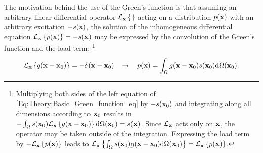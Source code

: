 The motivation behind the use of the Green's function is that assuming an arbitrary linear differential operator $\mathcal{L}_{\mathbf{x}}\left\{ \right\}$ acting on a distribution $p(\mathbf{x})$ with an arbitrary excitation $-s(\mathbf{x})$, the solution of the inhomogeneous differential equation $\mathcal{L}_{\mathbf{x}} \left\{ p(\mathbf{x}) \right\} = -s(\mathbf{x})$ may be expressed by the convolution of the Green's function and the load term:
\footnote{Multiplying both sides of the left equation of \eqref{Eq:Theory:Basic_Green_function_eq} by $-s(\mathbf{x}_0)$ and integrating along all dimensions according to $\mathbf{x}_0$ results in
$-\int_{\Omega} s(\mathbf{x}_0)\mathcal{L}_{\mathbf{x}}\left\{ g(\mathbf{x}-\mathbf{x}_0) \right\} \mathrm{d} \Omega(\mathbf{x}_0) = s(\mathbf{x})$.
Since $\mathcal{L}_{\mathbf{x}}$ acts only on $\mathbf{x}$, the operator may be taken outside of the integration.
Expressing the load term by $-\mathcal{L}_{\mathbf{x}}\left\{ p(\mathbf{x}) \right\}$ leads to $\mathcal{L}_{\mathbf{x}}\left\{ \int_{\Omega} s(\mathbf{x}_0) g(\mathbf{x}-\mathbf{x}_0) \mathrm{d} \Omega(\mathbf{x}_0) \right\} = \mathcal{L}_{\mathbf{x}}\left\{ p(\mathbf{x}) \right\}$.
}
\begin{equation}
\mathcal{L}_{\mathbf{x}}\left\{ g(\mathbf{x}-\mathbf{x}_0) \right\} = -\delta( \mathbf{x}-\mathbf{x}_0 ) \hspace{3mm} \rightarrow \hspace{3mm}
p(\mathbf{x}) = \int_{\Omega}  g(\mathbf{x}-\mathbf{x}_0) s(\mathbf{x}_0) \mathrm{d} \Omega (\mathbf{x}_0).
\label{Eq:Theory:Basic_Green_function_eq}
\end{equation}

